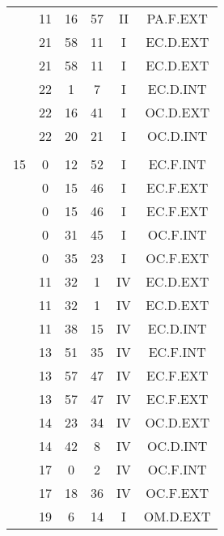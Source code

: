 \documentclass[12pt, a4paper]{article}
\begin{document}
\begin{multicols}{3}
{\begin{tabular}{c c c c c c}
	 	 	 	 & 11 & 16 & 57 & II & PA.F.EXT\\%
	 	 	 	 & 21 & 58 & 11 & I & EC.D.EXT\\%
	 	 	 	 & 21 & 58 & 11 & I & EC.D.EXT\\%
	 	 	 	 & 22 & 1 & 7 & I & EC.D.INT\\%
	 	 	 	 & 22 & 16 & 41 & I & OC.D.EXT\\%
	 	 	 	 & 22 & 20 & 21 & I & OC.D.INT\\%
	 	 	 	 & & & & & \\%
	 	 	 	15 & 0 & 12 & 52 & I & EC.F.INT\\%
	 	 	 	 & 0 & 15 & 46 & I & EC.F.EXT\\%
	 	 	 	 & 0 & 15 & 46 & I & EC.F.EXT\\%
	 	 	 	 & 0 & 31 & 45 & I & OC.F.INT\\%
	 	 	 	 & 0 & 35 & 23 & I & OC.F.EXT\\%
	 	 	 	 & 11 & 32 & 1 & IV & EC.D.EXT\\%
	 	 	 	 & 11 & 32 & 1 & IV & EC.D.EXT\\%
	 	 	 	 & 11 & 38 & 15 & IV & EC.D.INT\\%
	 	 	 	 & 13 & 51 & 35 & IV & EC.F.INT\\%
	 	 	 	 & 13 & 57 & 47 & IV & EC.F.EXT\\%
	 	 	 	 & 13 & 57 & 47 & IV & EC.F.EXT\\%
	 	 	 	 & 14 & 23 & 34 & IV & OC.D.EXT\\%
	 	 	 	 & 14 & 42 & 8 & IV & OC.D.INT\\%
	 	 	 	 & 17 & 0 & 2 & IV & OC.F.INT\\%
	 	 	 	 & 17 & 18 & 36 & IV & OC.F.EXT\\%
	 	 	 	 & 19 & 6 & 14 & I & OM.D.EXT\\%

\end{tabular}}
\end{multicols}
\end{document}
